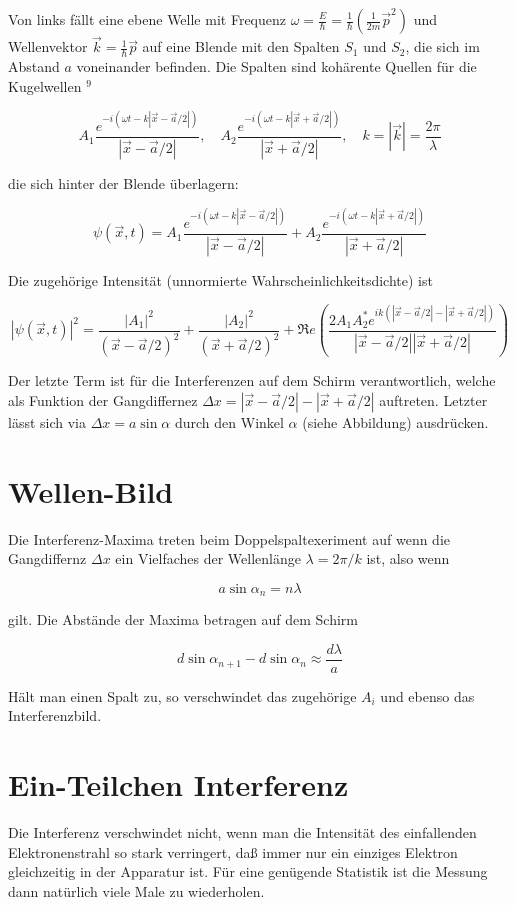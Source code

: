 \documentclass[10pt, letterpaper]{article}
\begin{document}
Von links fällt eine ebene Welle mit Frequenz $\omega=\frac{E}{\hbar}=\frac{1}{\hbar}\left(\frac{1}{2 m} \vec{p}^{2}\right)$ und Wellenvektor $\vec{k}=\frac{1}{\hbar} \vec{p}$ auf eine Blende mit den Spalten $S_{1}$ und $S_{2}$, die sich im Abstand $a$ voneinander befinden. Die Spalten sind kohärente Quellen für die Kugelwellen ${ }^{9}$

$$
A_{1} \frac{e^{-i(\omega t-k|\vec{x}-\vec{a} / 2|)}}{|\vec{x}-\vec{a} / 2|}, \quad A_{2} \frac{e^{-i(\omega t-k|\vec{x}+\vec{a} / 2|)}}{|\vec{x}+\vec{a} / 2|}, \quad k=|\vec{k}|=\frac{2 \pi}{\lambda}
$$

die sich hinter der Blende überlagern:

$$
\psi(\vec{x}, t)=A_{1} \frac{e^{-i(\omega t-k|\vec{x}-\vec{a} / 2|)}}{|\vec{x}-\vec{a} / 2|}+A_{2} \frac{e^{-i(\omega t-k|\vec{x}+\vec{a} / 2|)}}{|\vec{x}+\vec{a} / 2|}
$$

Die zugehörige Intensität (unnormierte Wahrscheinlichkeitsdichte) ist

$$
|\psi(\vec{x}, t)|^{2}=\frac{\left|A_{1}\right|^{2}}{(\vec{x}-\vec{a} / 2)^{2}}+\frac{\left|A_{2}\right|^{2}}{(\vec{x}+\vec{a} / 2)^{2}}+\Re e\left(\frac{2 A_{1} A_{2}^{*} e^{i k(|\vec{x}-\vec{a} / 2|-|\vec{x}+\vec{a} / 2|)}}{|\vec{x}-\vec{a} / 2||\vec{x}+\vec{a} / 2|}\right)
$$

Der letzte Term ist für die Interferenzen auf dem Schirm verantwortlich, welche als Funktion der Gangdiffernez $\Delta x=|\vec{x}-\vec{a} / 2|-|\vec{x}+\vec{a} / 2|$ auftreten. Letzter lässt sich via $\Delta x=a \sin \alpha$ durch den Winkel $\alpha$ (siehe Abbildung) ausdrücken.

\section*{Wellen-Bild}
Die Interferenz-Maxima treten beim Doppelspaltexeriment auf wenn die Gangdiffernz $\Delta x$ ein Vielfaches der Wellenlänge $\lambda=2 \pi / k$ ist, also wenn

$$
a \sin \alpha_{n}=n \lambda
$$

gilt. Die Abstände der Maxima betragen auf dem Schirm

$$
d \sin \alpha_{n+1}-d \sin \alpha_{n} \approx \frac{d \lambda}{a}
$$

Hält man einen Spalt zu, so verschwindet das zugehörige $A_{i}$ und ebenso das Interferenzbild.

\section*{Ein-Teilchen Interferenz}
Die Interferenz verschwindet nicht, wenn man die Intensität des einfallenden Elektronenstrahl so stark verringert, daß immer nur ein einziges Elektron gleichzeitig in der Apparatur ist. Für eine genügende Statistik ist die Messung dann natürlich viele Male zu wiederholen.
\end{document}
